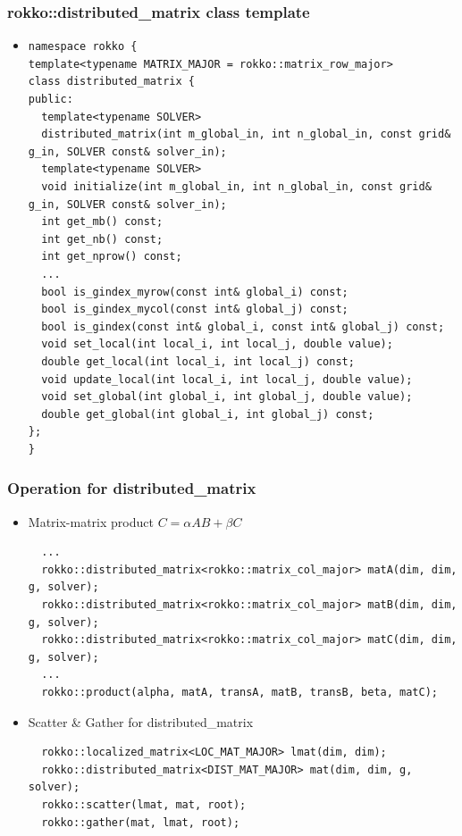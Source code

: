\begin{frame}[c,fragile]
  \frametitle{rokko::distributed_matrix class template}
  \begin{itemize}
  \item {}
\begin{lstlisting}
namespace rokko {
template<typename MATRIX_MAJOR = rokko::matrix_row_major>
class distributed_matrix {
public:
  template<typename SOLVER>
  distributed_matrix(int m_global_in, int n_global_in, const grid& g_in, SOLVER const& solver_in);
  template<typename SOLVER>
  void initialize(int m_global_in, int n_global_in, const grid& g_in, SOLVER const& solver_in);
  int get_mb() const;
  int get_nb() const;
  int get_nprow() const;
  ...
  bool is_gindex_myrow(const int& global_i) const;
  bool is_gindex_mycol(const int& global_j) const;
  bool is_gindex(const int& global_i, const int& global_j) const;
  void set_local(int local_i, int local_j, double value);
  double get_local(int local_i, int local_j) const;
  void update_local(int local_i, int local_j, double value);
  void set_global(int global_i, int global_j, double value);
  double get_global(int global_i, int global_j) const;
};
}
\end{lstlisting}
  \end{itemize}
\end{frame}

\begin{frame}[c,fragile]
  \frametitle{Operation for distributed_matrix}
  \begin{itemize}
  \item Matrix-matrix product $C = \alpha A B + \beta C$
\begin{lstlisting}
  ...
  rokko::distributed_matrix<rokko::matrix_col_major> matA(dim, dim, g, solver);
  rokko::distributed_matrix<rokko::matrix_col_major> matB(dim, dim, g, solver);
  rokko::distributed_matrix<rokko::matrix_col_major> matC(dim, dim, g, solver);
  ...
  rokko::product(alpha, matA, transA, matB, transB, beta, matC);
\end{lstlisting}
  \item Scatter \& Gather for distributed_matrix
\begin{lstlisting}
  rokko::localized_matrix<LOC_MAT_MAJOR> lmat(dim, dim);
  rokko::distributed_matrix<DIST_MAT_MAJOR> mat(dim, dim, g, solver);
  rokko::scatter(lmat, mat, root);
  rokko::gather(mat, lmat, root);
\end{lstlisting}
  \end{itemize}
\end{frame}

